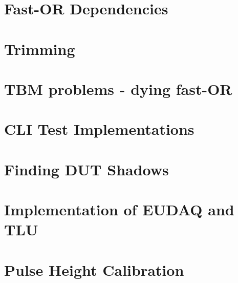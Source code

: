 \section{Fast-OR Dependencies}
\section{Trimming}
\section{\ac{TBM} problems - dying fast-OR}
\section{\ac{CLI} Test Implementations}
\section{Finding \ac{DUT} Shadows}
\section{Implementation of EUDAQ and \ac{TLU} }
\section{Pulse Height Calibration}
